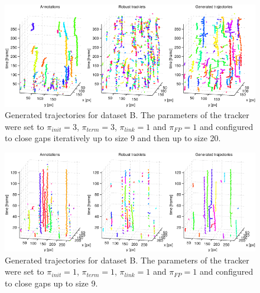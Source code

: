 \begin{figure}
	\includegraphics[width=\textwidth]{images/fig_results_tracker_dataset_4}
	\caption{Generated trajectories for dataset B. The parameters of the tracker were set to $\pi_{init}=3$, $\pi_{term}=3$, $\pi_{link}=1$ and $\pi_{FP}=1$ and configured to close gaps iteratively up to size 9 and then up to size 20.}
	\label{fig:results_tracker_dataset_4}
\end{figure}
\begin{figure}
	\includegraphics[width=\textwidth]{images/fig_results_tracker_dataset_5}
	\caption{Generated trajectories for dataset B. The parameters of the tracker were set to $\pi_{init}=1$, $\pi_{term}=1$, $\pi_{link}=1$ and $\pi_{FP}=1$ and configured to close gaps up to size 9.}
	\label{fig:results_tracker_dataset_5}
\end{figure}			